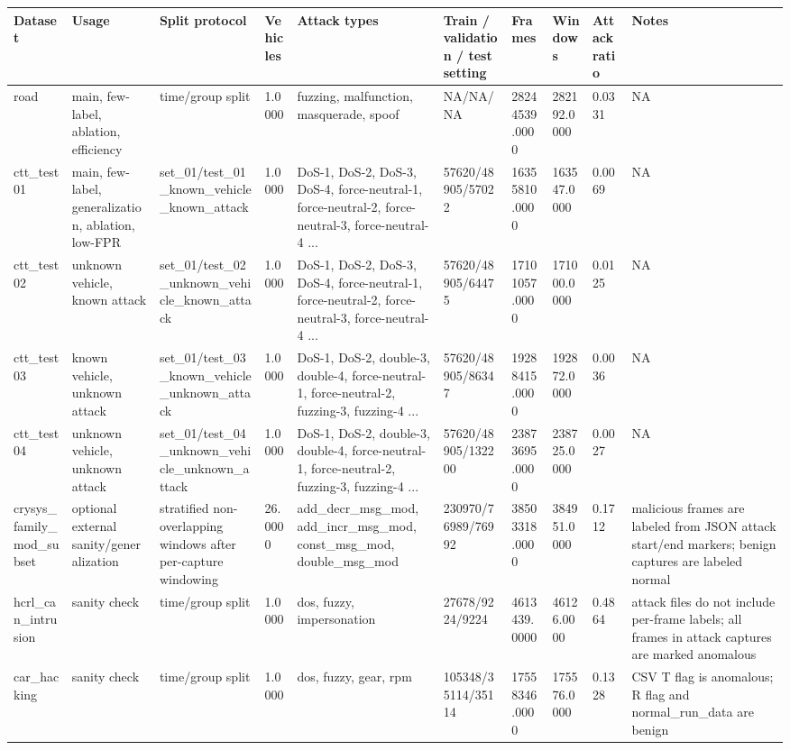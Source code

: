 \begin{tabular}{llllllllll}
\toprule
Dataset & Usage & Split protocol & Vehicles & Attack types & Train / validation / test setting & Frames & Windows & Attack ratio & Notes \\
\midrule
road & main, few-label, ablation, efficiency & time/group split & 1.0000 & fuzzing, malfunction, masquerade, spoof & NA/NA/NA & 28244539.0000 & 282192.0000 & 0.0331 & NA \\
ctt_test01 & main, few-label, generalization, ablation, low-FPR & set_01/test_01_known_vehicle_known_attack & 1.0000 & DoS-1, DoS-2, DoS-3, DoS-4, force-neutral-1, force-neutral-2, force-neutral-3, force-neutral-4 ... & 57620/48905/57022 & 16355810.0000 & 163547.0000 & 0.0069 & NA \\
ctt_test02 & unknown vehicle, known attack & set_01/test_02_unknown_vehicle_known_attack & 1.0000 & DoS-1, DoS-2, DoS-3, DoS-4, force-neutral-1, force-neutral-2, force-neutral-3, force-neutral-4 ... & 57620/48905/64475 & 17101057.0000 & 171000.0000 & 0.0125 & NA \\
ctt_test03 & known vehicle, unknown attack & set_01/test_03_known_vehicle_unknown_attack & 1.0000 & DoS-1, DoS-2, double-3, double-4, force-neutral-1, force-neutral-2, fuzzing-3, fuzzing-4 ... & 57620/48905/86347 & 19288415.0000 & 192872.0000 & 0.0036 & NA \\
ctt_test04 & unknown vehicle, unknown attack & set_01/test_04_unknown_vehicle_unknown_attack & 1.0000 & DoS-1, DoS-2, double-3, double-4, force-neutral-1, force-neutral-2, fuzzing-3, fuzzing-4 ... & 57620/48905/132200 & 23873695.0000 & 238725.0000 & 0.0027 & NA \\
crysys_family_mod_subset & optional external sanity/generalization & stratified non-overlapping windows after per-capture windowing & 26.0000 & add_decr_msg_mod, add_incr_msg_mod, const_msg_mod, double_msg_mod & 230970/76989/76992 & 38503318.0000 & 384951.0000 & 0.1712 & malicious frames are labeled from JSON attack start/end markers; benign captures are labeled normal \\
hcrl_can_intrusion & sanity check & time/group split & 1.0000 & dos, fuzzy, impersonation & 27678/9224/9224 & 4613439.0000 & 46126.0000 & 0.4864 & attack files do not include per-frame labels; all frames in attack captures are marked anomalous \\
car_hacking & sanity check & time/group split & 1.0000 & dos, fuzzy, gear, rpm & 105348/35114/35114 & 17558346.0000 & 175576.0000 & 0.1328 & CSV T flag is anomalous; R flag and normal_run_data are benign \\
\bottomrule
\end{tabular}
